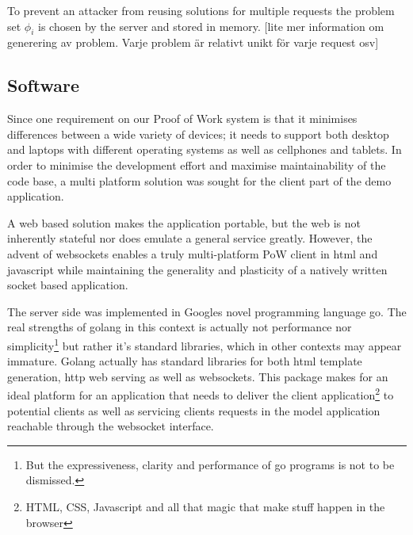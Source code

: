 To prevent an attacker from reusing solutions for multiple requests the problem set $\phi_i$ is chosen by the server and stored in memory.
[lite mer information om generering av problem. Varje problem är relativt unikt för varje request osv]


\subsection{Software}
Since one requirement on our Proof of Work system is that it minimises differences between a wide variety of devices; it needs to support both desktop and laptops with different operating systems as well as cellphones and tablets.
In order to minimise the development effort and maximise maintainability of the code base, a multi platform solution was sought for the client part of the demo application. 

A web based solution makes the application portable, but the web is not inherently stateful nor does emulate a general service greatly. However, the advent of websockets enables a truly multi-platform PoW client in html and javascript while maintaining the generality and plasticity of a natively written socket based application. 
\begin{comment}
The javascript implementation for handling the protocol is quite simple:
\jscode[firstline=57, firstnumber=57, lastline=84]{../pow.js}
The solution finding part also need to be presented:
\jscode[firstline=26, firstnumber=26, lastline=49]{../pow.js}
To trigger a request to be sent to the server we build the following function which is then registered to the onclick event of a button in the web gui:
\jscode[firstline=100, firstnumber=100, lastline=105]{../pow.js}
\end{comment}

The server side was implemented in Googles novel programming language go\cite{golang}. The real strengths of golang in this context is actually not performance nor simplicity\footnote{But the expressiveness, clarity and performance of go programs is not to be dismissed.} but rather it's standard libraries, which in other contexts may appear immature. Golang actually has standard libraries for both html template generation, http web serving as well as websockets. This package makes for an ideal platform for an application that needs to deliver the client application\footnote{HTML, CSS, Javascript and all that magic that make stuff happen in the browser} to potential clients as well as servicing clients requests in the model application reachable through the websocket interface. 

